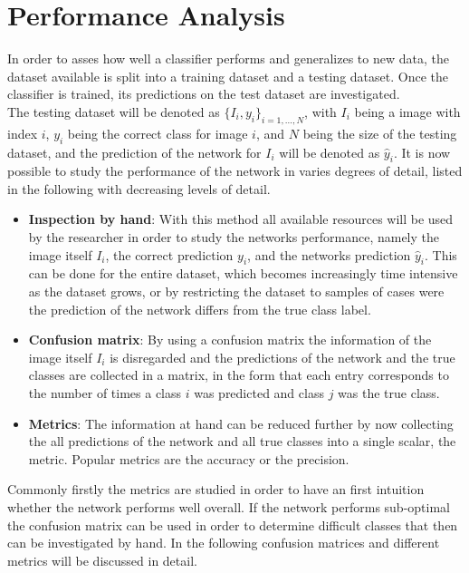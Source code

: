 \section{Performance Analysis}

In order to asses how well a classifier performs and generalizes to new data, the dataset available is split into a training dataset and a testing dataset. Once the classifier is trained, its predictions on the test dataset are investigated. \\

The testing dataset will be denoted as $\{I_i,y_i\}_{i=1,\dots ,N} $, with $I_i$ being a image with index $i$, $y_i$ being the correct class for image $i$, and $N$ being the size of the testing dataset, and the prediction of the network for $I_i$ will be denoted as $\hat{y}_i$. It is now possible to study the performance of the network in varies degrees of detail, listed in the following with decreasing levels of detail.

\begin{itemize}
\item \textbf{Inspection by hand}: With this method all available resources will be used by the researcher in order to study the networks performance, namely the image itself $I_i$, the correct prediction $y_i$, and the networks prediction $\hat{y}_i$. This can be done for the entire dataset, which becomes increasingly time intensive as the dataset grows, or by restricting the dataset to samples of cases were the prediction of the network differs from the true class label.
\item \textbf{Confusion matrix}: By using a confusion matrix the information of the image itself $I_i$ is disregarded and the predictions of the network and the true classes are collected in a matrix, in the form that each entry corresponds to the number of times a class $i$ was predicted and class $j$ was the true class.
\item \textbf{Metrics}: The information at hand can be reduced further by now collecting the all predictions of the network and all true classes into a single scalar, the metric. Popular metrics are the accuracy or the precision.
\end{itemize}

Commonly firstly the metrics are studied in order to have an first intuition whether the network performs well overall. If the network performs sub-optimal the confusion matrix can be used in order to determine difficult classes that then can be investigated by hand. In the following confusion matrices and different metrics will be discussed in detail.



